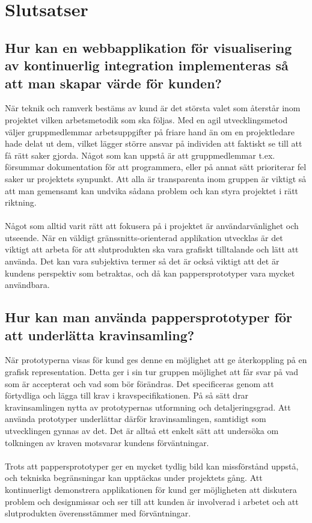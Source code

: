 \chapter{Slutsatser}
\label{cha:conclusion}

\section{Hur kan en webbapplikation för visualisering av kontinuerlig integration implementeras så att man skapar värde för kunden?}
När teknik och ramverk bestäms av kund är det största valet
som återstår inom projektet vilken arbetsmetodik som ska följas.
Med en agil utvecklingsmetod väljer gruppmedlemmar arbetsuppgifter
på friare hand än om en projektledare hade delat ut dem, vilket
lägger större ansvar på individen att faktiskt se till att få
rätt saker gjorda. Något som kan uppstå är att gruppmedlemmar t.ex.
försummar dokumentation för att programmera, eller på annat
sätt prioriterar fel saker ur projektets synpunkt. Att alla
är transparenta inom gruppen är viktigt så att man gemensamt
kan undvika sådana problem och kan styra projektet i rätt riktning.
\\ \\
Något som alltid varit rätt att fokusera på i projektet
är användarvänlighet och utseende. När en väldigt
gränssnitts-orienterad applikation utvecklas är det viktigt att
arbeta för att slutprodukten ska vara grafiskt
tilltalande och lätt att använda. Det kan vara subjektiva termer
så det är också viktigt att det är kundens perspektiv som betraktas, och då
kan pappersprototyper vara mycket användbara.

\section{Hur kan man använda pappersprototyper för att underlätta kravinsamling?}
När prototyperna visas för kund ges denne en möjlighet att ge återkoppling på en grafisk representation. Detta ger i sin tur gruppen möjlighet att får svar på vad som är accepterat och vad som bör förändras. Det specificeras genom att förtydliga och lägga till krav i kravspecifikationen. På så sätt drar kravinsamlingen nytta av prototypernas utformning och detaljeringsgrad. Att använda prototyper underlättar därför kravinsamlingen, samtidigt som utvecklingen gynnas av det. Det är alltså ett enkelt sätt att undersöka om tolkningen av kraven motsvarar kundens förväntningar.
\\ \\
Trots att pappersprototyper ger en mycket tydlig bild kan missförstånd
uppstå, och tekniska begränsningar kan upptäckas under projektets gång.
Att kontinuerligt demonstrera applikationen för kund ger möjligheten att
diskutera problem och designmissar och ser till att kunden är involverad i
arbetet och att slutprodukten överensstämmer med förväntningar.

